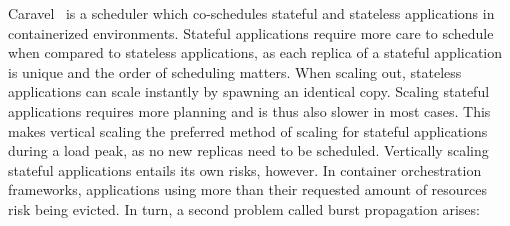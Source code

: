 %
Caravel~\citep{caravel} is a scheduler which co-schedules stateful and stateless applications in containerized environments. Stateful applications require more care to schedule when compared to stateless applications, as each replica of a stateful application is unique and the order of scheduling matters. When scaling out, stateless applications can scale instantly by spawning an identical copy. Scaling stateful applications requires more planning and is thus also slower in most cases. This makes vertical scaling the preferred method of scaling for stateful applications during a load peak, as no new replicas need to be scheduled. Vertically scaling stateful applications entails its own risks, however. In container orchestration frameworks, applications using more than their requested amount of resources risk being evicted. In turn, a second problem called burst propagation arises: %
%
